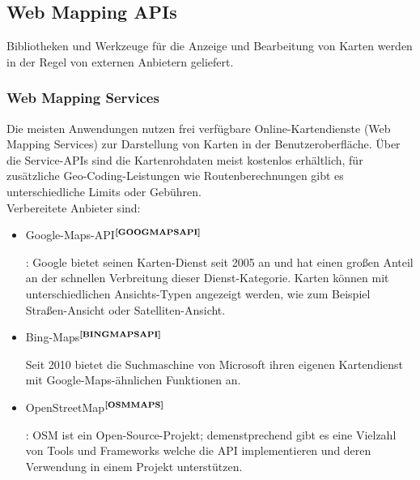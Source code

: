 \subsection{Web Mapping APIs}\label{3_WEBMAPAPIS}
Bibliotheken und Werkzeuge für die Anzeige und Bearbeitung von Karten werden in der Regel von externen Anbietern geliefert.

\subsubsection{Web Mapping Services}
Die meisten Anwendungen nutzen frei verfügbare Online-Kartendienste (Web Mapping Services) zur Darstellung von Karten in der Benutzeroberfläche. Über die Service-APIs sind die Kartenrohdaten meist kostenlos erhältlich, für zusätzliche Geo-Coding-Leistungen wie Routenberechnungen gibt es unterschiedliche Limits oder Gebühren.\\
Verbereitete Anbieter sind:
\begin{itemize}
  \item Google-Maps-API$^{\textbf{\ref{GOOGMAPSAPI}}}$
\addtocounter{footnote}{1}
:
Google bietet seinen Karten-Dienst seit 2005 an und hat einen großen Anteil an der schnellen Verbreitung
dieser Dienst-Kategorie. Karten können mit unterschiedlichen Ansichts-Typen angezeigt werden, wie zum Beispiel Straßen-Ansicht oder Satelliten-Ansicht.
  \item Bing-Maps$^{\textbf{\ref{BINGMAPSAPI}}}$
\addtocounter{footnote}{1}
Seit 2010 bietet die Suchmaschine von Microsoft ihren eigenen Kartendienst mit Google-Maps-ähnlichen Funktionen an.
  \item OpenStreetMap$^{\textbf{\ref{OSMMAPS}}}$
\addtocounter{footnote}{1}
:
OSM ist ein Open-Source-Projekt; demenstprechend gibt es eine Vielzahl von Tools und Frameworks welche die API implementieren und deren Verwendung in einem Projekt unterstützen.
\end{itemize}

